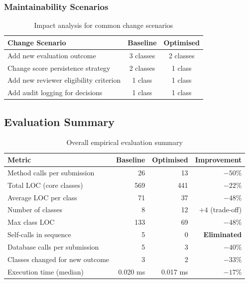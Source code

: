\documentclass[12pt, a4paper]{article}
\begin{document}
\subsubsection{Maintainability Scenarios}

\begin{table}[H]
\centering
\caption{Impact analysis for common change scenarios}
\label{tab:maintainability}
\begin{tabularx}{\textwidth}{X c c}
    \toprule
    \textbf{Change Scenario} & \textbf{Baseline} & \textbf{Optimised} \\
    \midrule
    Add new evaluation outcome & 3 classes & 2 classes \\
    Change score persistence strategy & 2 classes & 1 class \\
    Add new reviewer eligibility criterion & 1 class & 1 class \\
    Add audit logging for decisions & 1 class & 1 class \\
    \bottomrule
\end{tabularx}
\end{table}

\subsection{Evaluation Summary}

\begin{table}[H]
\centering
\caption{Overall empirical evaluation summary}
\label{tab:eval-summary}
\begin{tabular}{l r r r}
    \toprule
    \textbf{Metric} & \textbf{Baseline} & \textbf{Optimised} & \textbf{Improvement} \\
    \midrule
    Method calls per submission & 26 & 13 & \textbf{$-50\%$} \\
    Total LOC (core classes) & 569 & 441 & \textbf{$-22\%$} \\
    Average LOC per class & 71 & 37 & \textbf{$-48\%$} \\
    Number of classes & 8 & 12 & $+4$ (trade-off) \\
    Max class LOC & 133 & 69 & \textbf{$-48\%$} \\
    Self-calls in sequence & 5 & 0 & \textbf{Eliminated} \\
    Database calls per submission & 5 & 3 & \textbf{$-40\%$} \\
    Classes changed for new outcome & 3 & 2 & \textbf{$-33\%$} \\
    Execution time (median) & 0.020 ms & 0.017 ms & \textbf{$-17\%$} \\
    \bottomrule
\end{tabular}
\end{table}
\end{document}
